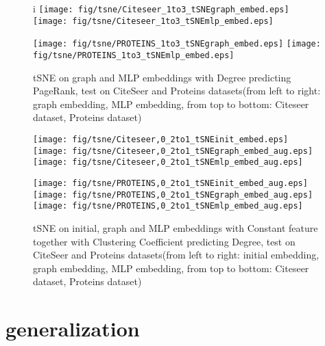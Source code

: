 \documentclass[runningheads]{llncs}
\begin{document}
  \begin{figure}
    \centering
    \begin{center}i
    \hspace*{-1in}
        \texttt{[image: fig/tsne/Citeseer\_1to3\_tSNEgraph\_embed.eps]}
        \texttt{[image: fig/tsne/Citeseer\_1to3\_tSNEmlp\_embed.eps]}
        \hspace*{-1in}
  
      \hspace*{-1in}
        \texttt{[image: fig/tsne/PROTEINS\_1to3\_tSNEgraph\_embed.eps]}
        \texttt{[image: fig/tsne/PROTEINS\_1to3\_tSNEmlp\_embed.eps]}
        \hspace*{-1in}
        \caption{tSNE on graph and MLP embeddings with Degree predicting PageRank, test on
        CiteSeer and Proteins datasets(from left to right: graph embedding, MLP embedding, from top to bottom: Citeseer dataset, Proteins dataset)}
  
        \hspace*{-1in}
        \texttt{[image: fig/tsne/Citeseer,0\_2to1\_tSNEinit\_embed.eps]}
        \texttt{[image: fig/tsne/Citeseer,0\_2to1\_tSNEgraph\_embed\_aug.eps]}
        \texttt{[image: fig/tsne/Citeseer,0\_2to1\_tSNEmlp\_embed\_aug.eps]}
        \hspace*{-1in}
  
        \hspace*{-1in}
        \texttt{[image: fig/tsne/PROTEINS,0\_2to1\_tSNEinit\_embed\_aug.eps]}
        \texttt{[image: fig/tsne/PROTEINS,0\_2to1\_tSNEgraph\_embed\_aug.eps]}
        \texttt{[image: fig/tsne/PROTEINS,0\_2to1\_tSNEmlp\_embed\_aug.eps]}
        \hspace*{-1in}
        \caption{tSNE on initial, graph and MLP embeddings with Constant feature together with Clustering Coefficient predicting Degree, test on
CiteSeer and Proteins datasets(from left to right: initial embedding, graph embedding, MLP embedding, from top to bottom: Citeseer dataset, Proteins dataset)}
        
    \end{center}
    \end{figure}

\section{generalization}
\end{document}
